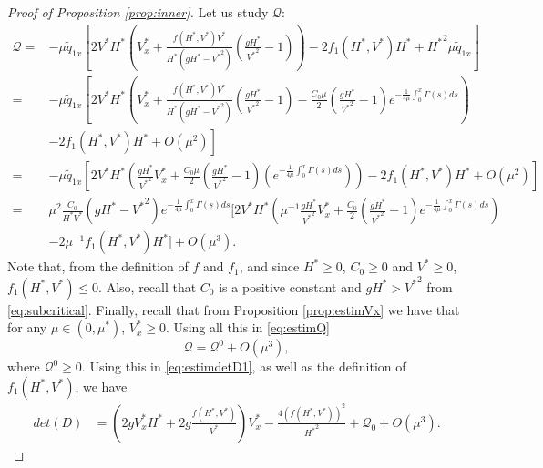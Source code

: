 \documentclass[11pt]{article}
\begin{document}
\begin{proof}[Proof of Proposition \ref{prop:inner}]
{ Let us study $\mathcal{Q}$:
\small \begin{equation}
\begin{split}
\label{eq:estimQ}
\mathcal{Q}
=&-\mu\tilde{q}_{1x}\left[2V^{*}H^{*}\left(V_{x}^{*}+\frac{f(H^{*},V^{*})V^{*}}{H^{*}(gH^{*}-{V^{*}}^{2})}\left(\frac{g H^{*}}{{V^{*}}^{2}}-1\right)\right)-2f_{1}(H^{*},V^{*})H^{*}+{H^{*}}^{2}\mu\tilde{q}_{1x}\right]\\
=&-\mu\tilde{q}_{1x}\left[2V^{*}H^{*}\left(V_{x}^{*}+\frac{f(H^{*},V^{*})V^{*}}{H^{*}(gH^{*}-{V^{*}}^{2})}\left(\frac{g H^{*}}{{V^{*}}^{2}}-1\right)-\frac{C_{0}\mu}{2}\left(\frac{g H^{*}}{{V^{*}}^{2}}-1\right)e^{-\frac{1}{4\mu}\int_{0}^{x}{\Gamma(s)}ds}
\right)\right.\\
&\left.-2f_{1}(H^{*},V^{*})H^{*}+O(\mu^{2})\right]\\
=&-\mu\tilde{q}_{1x}\left[2V^{*}H^{*}\left(\frac{gH^{*}}{{V^{*}}^{2}}V_{x}^{*}+\frac{C_{0}\mu}{2}\left(\frac{g H^{*}}{{V^{*}}^{2}}-1\right) 
\left( e^{-\frac{1}{4\mu}\int_{0}^{x}{\Gamma(s)}ds}\right)\right) -2f_{1}(H^{*},V^{*})H^{*}+O(\mu^{2})\right]  \\
=&\mu^{2}\frac{C_{0}}{H^{*}V^{*}}(gH^{*}-{V^{*}}^{2})e^{-\frac{1}{4\mu}\int_{0}^{x}{\Gamma(s)}ds}\Big[2V^{*}H^{*}\left( \mu^{-1} \frac{gH^{*}}{{V^{*}}^{2}}V_{x}^{*}+\frac{C_{0}}{2}\left(\frac{g H^{*}}{{V^{*}}^{2}}-1\right)e^{-\frac{1}{4\mu}\int_{0}^{x}{\Gamma(s)}ds}\right)\\
&-2\mu^{-1}f_{1}(H^{*},V^{*})H^{*}\Big]+O(\mu^{3}).
\end{split}
\end{equation}
\normalsize
Note that, from the definition of $f$ and $f_{1}$, and since $H^{*}\geq 0$, $C_{0}\geq 0$ and $V^{*}\geq 0$, $f_{1}(H^{*},V^{*})\leq 0$. Also, recall that $C_{0}$ is a positive constant and $gH^{*}>{V^{*}}^{2}$ from \eqref{eq:subcritical}. Finally, recall that from Proposition \ref{prop:estimVx} we have that for any $\mu\in(0,\mu^{*})$, $V_{x}^{*} \geq 0$. Using all this in \eqref{eq:estimQ}
\begin{equation}
    \mathcal{Q} = \mathcal{Q}^{0}+O(\mu^{3}),
\end{equation}
where $\mathcal{Q}^{0}\geq 0$. Using this in \eqref{eq:estimdetD1}, as well as the definition of $f_{1}({H^{*}},{V^{*}})$, we have
}
\begin{equation}
    \begin{split}
        det(D) &= \left(2g{V_{x}^{*}}H^{*}+2g\frac{f(H^{*},V^{*})}{V^{*}}\right)V_{x}^{*} -\frac{4(f(H^{*},V^{*}))^{2}}{{H^{*}}^{2}}
        +\mathcal{Q}_{0}+O(\mu^3).
    \end{split}

\end{equation}
\end{proof}
\end{document}

